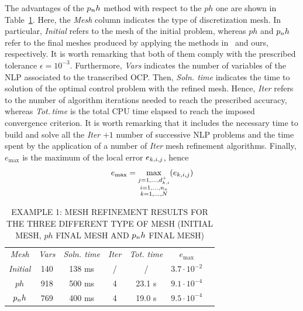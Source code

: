 The advantages of the $p_{n}h$ method with respect to the $ph$ one are shown in Table~\ref{tab:tablevanderpol}. Here, the \emph{Mesh} column indicates the type of discretization mesh. In particular, \emph{Initial} refers to the mesh of the initial problem, whereas $ph$ and $p_{n}h$ refer to the final meshes produced by applying the methods in~\cite{Patterson:OCAM:2015} and ours, respectively. It is worth remarking that both of them comply with the prescribed tolerance $\epsilon=10^{-3}$. Furthermore, \emph{Vars} indicates the number of variables of the NLP associated to the transcribed OCP. Then, \emph{Soln. time} indicates the time to solution of the optimal control problem with the refined mesh. Hence, \emph{Iter} refers to the number of algorithm iterations needed to reach the prescribed accuracy, whereas \emph{Tot.\,time} is the total CPU time elapsed to reach the imposed convergence criterion. It is worth remarking that it includes the necessary time to build and solve all the \emph{Iter} $+1$ number of successive NLP problems and the time spent by the application of a number of \emph{Iter} mesh refinement algorithms. Finally, $e_{\max}$  is the maximum of the local error $e_{k,i,j}$, hence
\begin{equation}
e_\text{max}= \max\limits_{\substack{j = 1, \dots, d_{k,i}^{+} \\ i = 1, \dots, n_x \\ k = 1, \dots, N}} (e_{k,i,j})
\end{equation}
\begin{table}[t]
	\caption{EXAMPLE 1: MESH REFINEMENT RESULTS FOR THE THREE DIFFERENT TYPE OF MESH (INITIAL MESH, $ph$ FINAL MESH AND $p_{n}h$ FINAL MESH)}
	\begin{center}
		\label{tab:tablevanderpol}
		\begin{tabular}{c c c c c c c}
			& & \\ %
			\hline
			\emph{Mesh} & \emph{Vars} & \emph{Soln. time} & \emph{Iter} & \emph{Tot. time} & $e_\text{max}$ \\
			\hline
			\emph{Initial} & 140 & 138 ms & / & / &  $3.7\cdot 10^{-2}$\\
			$ph$ & 918 & 500 ms & 4 & 23.1 s & $9.1\cdot 10^{-4}$ \\
			$p_{n}h$ & 769 & 400 ms & 4 & 19.0 s & $9.5\cdot 10^{-4}$ \\
			\hline
		\end{tabular}
	\end{center}
\end{table}
